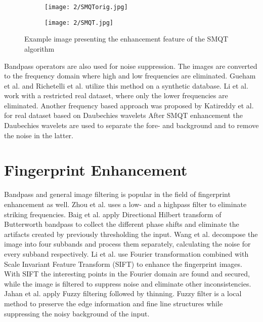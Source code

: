 \documentclass[draft,final]{vutinfth} %
\begin{document}
\begin{figure}[h]
  \centering
  \begin{subfigure}[t]{0.4\columnwidth}
    \centering
    \texttt{[image: 2/SMQTorig.jpg]}
    \label{fig:rw:SMQTin}
  \end{subfigure}
  \begin{subfigure}[t]{0.4\columnwidth}
    \centering
    \texttt{[image: 2/SMQT.jpg]}
    \label{fig:rw:SMQTout}
  \end{subfigure}
  \caption{Example image presenting the enhancement feature of the SMQT algorithm \cite{katireddy2017novel} }
  \label{fig:rw:SMQT} %
\end{figure}

\par
Bandpass operators are also used for noise suppression.
The images are converted to the frequency domain where high and low frequencies are eliminated.
Gueham et al. \cite{gueham2007automatic} and Richetelli et al. \cite{richetelli2017classification} utilize this method on a synthetic database.
Li et al. \cite{li2014retrieval} work with a restricted real dataset, where only the lower frequencies are eliminated.
Another frequency based approach was proposed by Katireddy et al. \cite{katireddy2017novel} for real dataset based on Daubechies wavelets
After SMQT enhancement the Daubechies wavelets are used to separate the fore- and background and to remove the noise in the latter.

\section*{Fingerprint Enhancement}

Bandpass and general image filtering is popular in the field of fingerprint enhancement as well.
Zhou et al. \cite{zhou2011adaptive} uses a low- and a highpass filter to eliminate striking frequencies. 
Baig et al. \cite{baig2015enhancement} apply Directional Hilbert transform of Butterworth bandpass to collect the different phase shifts and eliminate the artifacts created by previously thresholding the input.
Wang et al. \cite{wang2014enhanced} decompose the image into four subbands and process them separately, calculating the noise for every subband respectively.
Li et al. \cite{li2012texture} use Fourier transformation combined with Scale Invariant Feature Transform (SIFT) \cite{lowe1999object} to enhance the fingerprint images. 
With SIFT the interesting points in the Fourier domain are found and secured, while the image is filtered to suppress noise and eliminate other inconsistencies.
Jahan et al. \cite{jahan2017robust} apply Fuzzy filtering followed by thinning.
Fuzzy filter is a local method to preserve the edge information and fine line structures while suppressing the noisy background of the input.
\end{document}
